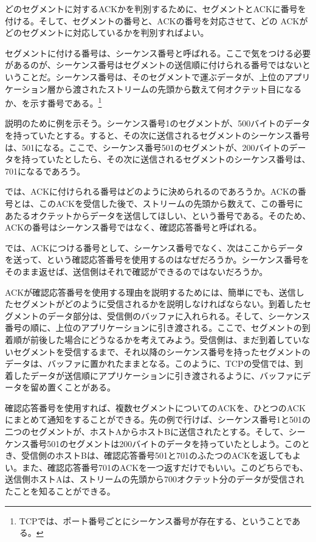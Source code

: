どのセグメントに対するACKかを判別するために、セグメントとACKに番号を付ける。そして、セグメントの番号と、ACKの番号を対応させて、どの ACKがどのセグメントに対応しているかを判別すればよい。

セグメントに付ける番号は、シーケンス番号と呼ばれる。ここで気をつける必要があるのが、シーケンス番号はセグメントの送信順に付けられる番号ではないということだ。シーケンス番号は、そのセグメントで運ぶデータが、上位のアプリケーション層から渡されたストリームの先頭から数えて何オクテット目になるか、を示す番号である。\footnote{TCPでは、ポート番号ごとにシーケンス番号が存在する、ということである。}

説明のために例を示そう。シーケンス番号1のセグメントが、500バイトのデータを持っていたとする。すると、その次に送信されるセグメントのシーケンス番号は、501になる。ここで、シーケンス番号501のセグメントが、200バイトのデータを持っていたとしたら、その次に送信されるセグメントのシーケンス番号は、701になるであろう。

では、ACKに付けられる番号はどのように決められるのであろうか。ACKの番号とは、このACKを受信した後で、ストリームの先頭から数えて、この番号にあたるオクテットからデータを送信してほしい、という番号である。そのため、ACKの番号はシーケンス番号ではなく、確認応答番号と呼ばれる。

では、ACKにつける番号として、シーケンス番号でなく、次はここからデータを送って、という確認応答番号を使用するのはなぜだろうか。シーケンス番号をそのまま返せば、送信側はそれで確認ができるのではないだろうか。

ACKが確認応答番号を使用する理由を説明するためには、簡単にでも、送信したセグメントがどのように受信されるかを説明しなければならない。到着したセグメントのデータ部分は、受信側のバッファに入れられる。そして、シーケンス番号の順に、上位のアプリケーションに引き渡される。ここで、セグメントの到着順が前後した場合にどうなるかを考えてみよう。受信側は、まだ到着していないセグメントを受信するまで、それ以降のシーケンス番号を持ったセグメントのデータは、バッファに置かれたままとなる。このように、TCPの受信では、到着したデータが送信順にアプリケーションに引き渡されるように、バッファにデータを留め置くことがある。

確認応答番号を使用すれば、複数セグメントについてのACKを、ひとつのACKにまとめて通知をすることができる。先の例で行けば、シーケンス番号1と501の二つのセグメントが、ホストAからホストBに送信されたとする。そして、シーケンス番号501のセグメントは200バイトのデータを持っていたとしよう。このとき、受信側のホストBは、確認応答番号501と701のふたつのACKを返してもよい。また、確認応答番号701のACKを一つ返すだけでもいい。このどちらでも、送信側ホストAは、ストリームの先頭から700オクテット分のデータが受信されたことを知ることができる。

